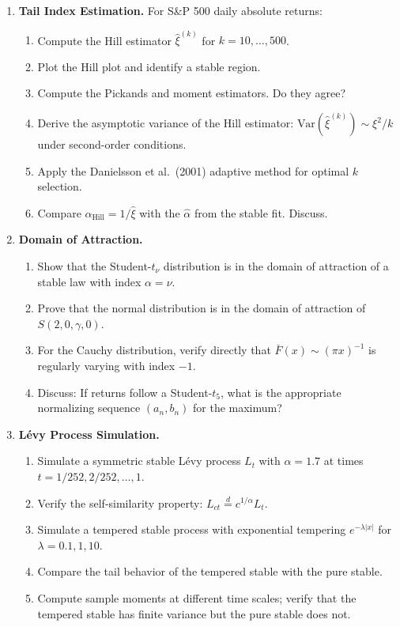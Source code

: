 \documentclass[11pt, a4paper]{article}
\newcommand{\Var}{\text{Var}}
\theoremstyle{definition}
\begin{document}
\begin{enumerate}[label=\textbf{P\arabic*.}]

\item \textbf{Tail Index Estimation.}
For S\&P 500 daily absolute returns:
\begin{enumerate}[label=(\alph*)]
  \item Compute the Hill estimator $\hat{\xi}^{(k)}$ for $k = 10, \ldots, 500$.
  \item Plot the Hill plot and identify a stable region.
  \item Compute the Pickands and moment estimators. Do they agree?
  \item Derive the asymptotic variance of the Hill estimator: $\Var(\hat{\xi}^{(k)}) \sim \xi^2/k$ under second-order conditions.
  \item Apply the Danielsson et al.\ (2001) adaptive method for optimal $k$ selection.
  \item Compare $\hat{\alpha}_{\text{Hill}} = 1/\hat{\xi}$ with the $\hat{\alpha}$ from the stable fit. Discuss.
\end{enumerate}

\item \textbf{Domain of Attraction.}
\begin{enumerate}[label=(\alph*)]
  \item Show that the Student-$t_\nu$ distribution is in the domain of attraction of a stable law with index $\alpha = \nu$.
  \item Prove that the normal distribution is in the domain of attraction of $S(2, 0, \gamma, 0)$.
  \item For the Cauchy distribution, verify directly that $\bar{F}(x) \sim (\pi x)^{-1}$ is regularly varying with index $-1$.
  \item Discuss: If returns follow a Student-$t_5$, what is the appropriate normalizing sequence $(a_n, b_n)$ for the maximum?
\end{enumerate}

\item \textbf{Lévy Process Simulation.}
\begin{enumerate}[label=(\alph*)]
  \item Simulate a symmetric stable Lévy process $L_t$ with $\alpha = 1.7$ at times $t = 1/252, 2/252, \ldots, 1$.
  \item Verify the self-similarity property: $L_{ct} \stackrel{d}{=} c^{1/\alpha} L_t$.
  \item Simulate a tempered stable process with exponential tempering $e^{-\lambda|x|}$ for $\lambda = 0.1, 1, 10$.
  \item Compare the tail behavior of the tempered stable with the pure stable.
  \item Compute sample moments at different time scales; verify that the tempered stable has finite variance but the pure stable does not.
\end{enumerate}


\end{enumerate}
\end{document}
